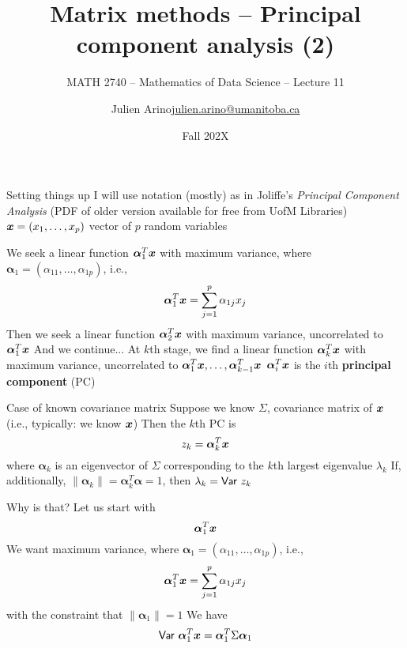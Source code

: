 \documentclass[aspectratio=169]{beamer}\usepackage[]{graphicx}\usepackage[]{xcolor}
\subtitle{MATH 2740 -- Mathematics of Data Science -- Lecture 11}
\author{\texorpdfstring{Julien Arino\newline\url{julien.arino@umanitoba.ca}}{Julien Arino}}
\institute{Department of Mathematics @ University of Manitoba}
\date{Fall 202X}
\title{Matrix methods -- Principal component analysis (2)}
\begin{document}







\begin{frame}{Setting things up}
I will use notation (mostly) as in Joliffe's \emph{Principal Component Analysis} (PDF of older version available for free from UofM Libraries)
\vfill
$\bm{x}=(x_1,\ldots,x_p)$ vector of $p$ random variables
\end{frame}


\begin{frame} 
We seek a linear function $\bm{\alpha}_1^T\bm{x}$ with maximum variance, where $\bm{\alpha}_1=(\alpha_{11},\ldots,\alpha_{1p})$, i.e.,
\[
\bm{\alpha}_1^T\bm{x} = \sum_{j=1}^p\alpha_{1j}x_j
\]
\vfill
Then we seek a linear function $\bm{\alpha}_2^T\bm{x}$ with maximum variance, uncorrelated to $\bm{\alpha}_1^T\bm{x}$
\vfill
And we continue...
\vfill
At $k$th stage, we find a linear function $\bm{\alpha}_k^T\bm{x}$ with maximum variance, uncorrelated to $\bm{\alpha}_1^T\bm{x},\ldots,\bm{\alpha}_{k-1}^T\bm{x}$
\vfill
$\bm{\alpha}_i^T\bm{x}$ is the $i$th \textbf{principal component} (PC)
\end{frame}

\begin{frame}{Case of known covariance matrix}
Suppose we know $\Sigma$, covariance matrix of $\bm{x}$ (i.e., typically: we know $\bm{x}$)
\vfill
Then the $k$th PC is 
\[
z_k=\bm{\alpha}_k^T\bm{x}
\]
where $\bm{\alpha}_k$ is an eigenvector of $\Sigma$ corresponding to the $k$th largest eigenvalue $\lambda_k$
\vfill
If, additionally, $\|\bm{\alpha}_k\|=\bm{\alpha}_k^T\bm{\alpha}=1$, then $\lambda_k=\mathsf{Var}\  z_k$
\end{frame}


\begin{frame}{Why is that?}
Let us start with
\[
\bm{\alpha}_1^T\bm{x}
\]
\vfill
We want maximum variance, where $\bm{\alpha}_1=(\alpha_{11},\ldots,\alpha_{1p})$, i.e.,
\[
\bm{\alpha}_1^T\bm{x} = \sum_{j=1}^p\alpha_{1j}x_j
\]
with the constraint that $\|\bm{\alpha}_1\|=1$
\vfill
We have
\[
\mathsf{Var}\  \bm{\alpha}_1^T\bm{x}
=\bm{\alpha}_1^T\Sigma\bm{\alpha}_1
\]
\end{frame}
\end{document}
